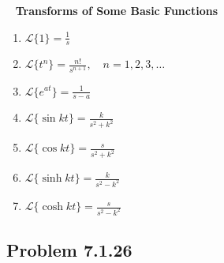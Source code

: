   \begin{boxedtheorem}[7.1.1] \hypertarget{def:Theorem 7.1.1}{}
  \ \newline
    \textbf{Transforms of Some Basic Functions}
    \begin{enumerate}[label=(\alph*), itemsep=1ex]
      \item $\displaystyle \mathscr{L}\{1\} = \frac{1}{s}$
      \item $\displaystyle \mathscr{L}\{t^n\} = \frac{n!}{s^{n+1}}, \quad n = 1, 2, 3, \dots$
      \item $\displaystyle \mathscr{L}\{e^{at}\} = \frac{1}{s - a}$
      \item $\displaystyle \mathscr{L}\{\sin kt\} = \frac{k}{s^2 + k^2}$
      \item $\displaystyle \mathscr{L}\{\cos kt\} = \frac{s}{s^2 + k^2}$
      \item $\displaystyle \mathscr{L}\{\sinh kt\} = \frac{k}{s^2 - k^2}$
      \item $\displaystyle \mathscr{L}\{\cosh kt\} = \frac{s}{s^2 - k^2}$
    \end{enumerate}
  \end{boxedtheorem}
  
  
\subsection*{Problem 7.1.26}
\vspace{-0.5cm}

